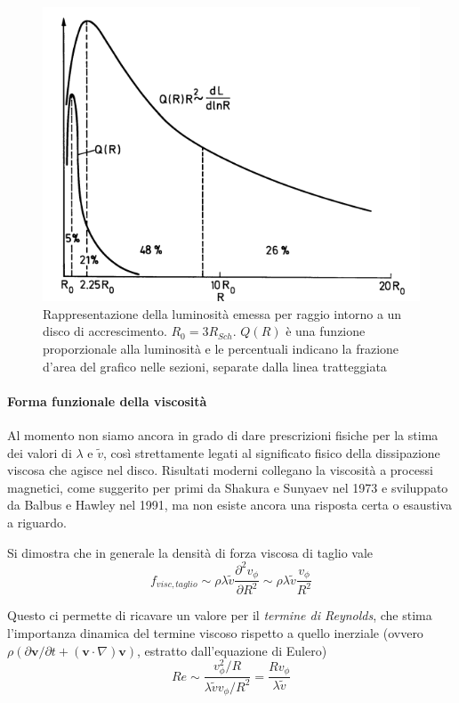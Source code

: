 \documentclass[a4paperbi]{article}
\begin{document}
	\begin{figure}[H]
		\centering
		\includegraphics[width=0.8\linewidth]{LuminositaRaggio}
		\caption{Rappresentazione della luminosità emessa per raggio intorno a un disco di accrescimento. $R_0=3R_{Sch}$. $Q(R)$ è una funzione proporzionale alla luminosità e le percentuali indicano la frazione d'area del grafico nelle sezioni, separate dalla linea tratteggiata}
		\label{fig:LuminositaRaggio}
	\end{figure}

	\paragraph{Forma funzionale della viscosità}	
	Al momento non siamo ancora in grado di dare prescrizioni fisiche per la stima dei valori di $\lambda$ e $\tilde{v}$, così strettamente legati al significato fisico della dissipazione viscosa che agisce nel disco. Risultati moderni collegano la viscosità a processi magnetici, come suggerito per primi da Shakura e Sunyaev nel 1973 e sviluppato da Balbus e Hawley nel 1991, ma non esiste ancora una risposta certa o esaustiva a riguardo. 
	
	Si dimostra che in generale la densità di forza viscosa di taglio vale
	\begin{equation}
		f_{visc,taglio}\sim\rho\lambda\tilde{v}\frac{\partial^2v_\phi}{\partial R^2}\sim\rho\lambda\tilde{v}\frac{v_\phi}{R^2}
	\end{equation}

	Questo ci permette di ricavare un valore per il \textit{termine di Reynolds}, che stima l'importanza dinamica del termine viscoso rispetto a quello inerziale (ovvero $\rho(\partial\textbf{v}/\partial t+(\textbf{v}\cdot\nabla)\textbf{v})$, estratto dall'equazione di Eulero)
	\begin{equation}
		Re\sim\frac{v_\phi^2/R}{\lambda\tilde{v}v_\phi/R^2}=\frac{Rv_\phi}{\lambda\tilde{v}}
	\end{equation}
	
\end{document}
